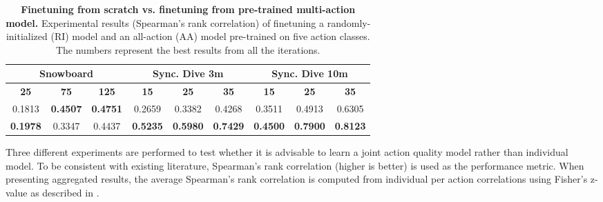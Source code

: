 \documentclass[10pt,twocolumn,letterpaper]{article}
\begin{document}
\begin{table*}[t]
\begin{tabular}{ccccccccc}
\toprule
\multicolumn{3}{c|}{\textbf{Snowboard}}                                                                 & \multicolumn{3}{c|}{\textbf{Sync. Dive 3m}}                                                            & \multicolumn{3}{c}{\textbf{Sync. Dive 10m}}                                                           \\ \midrule
\multicolumn{1}{c|}{\textbf{25}} & \multicolumn{1}{c|}{\textbf{75}} & \multicolumn{1}{c|}{\textbf{125}} & \multicolumn{1}{c|}{\textbf{15}} & \multicolumn{1}{c|}{\textbf{25}} & \multicolumn{1}{c|}{\textbf{35}} & \multicolumn{1}{c|}{\textbf{15}} & \multicolumn{1}{c|}{\textbf{25}} & \multicolumn{1}{c}{\textbf{35}} \\ \midrule
0.1813                            & \textbf{0.4507}                           & \textbf{0.4751}                            & 0.2659                           & 0.3382                           & 0.4268                           & 0.3511                           & 0.4913                           & 0.6305                           \\
\textbf{0.1978}                            & 0.3347                           & 0.4437                            & \textbf{0.5235}                           & \textbf{0.5980}                           & \textbf{0.7429}                           & \textbf{0.4500}                           & \textbf{0.7900}                           & \textbf{0.8123}                         \\ \bottomrule
\end{tabular}

\caption{\textbf{Finetuning from scratch vs. finetuning from pre-trained multi-action model.} Experimental results (Spearman's rank correlation) of finetuning a randomly-initialized (RI) model and an all-action (AA) model pre-trained on five action classes. The numbers represent the best results from all the iterations.}
\label{tab_ri_5vs1}
\end{table*} Three different experiments are performed to test whether it is advisable to learn a joint action quality model rather than individual model.  To be consistent with existing literature, Spearman's rank correlation (higher is better) is used as the performance metric. When presenting aggregated results, the average Spearman's rank correlation is computed from individual per action correlations using Fisher's z-value as described in \cite{garcia2010tutorial}.
\end{document}

